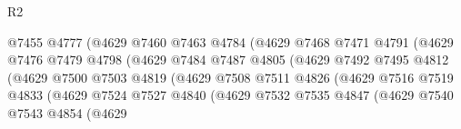 \begin{lexlean}{R2}
\begin{coremodule}
                                      @7455
                                      @4777
                                      (@4629
                                        @7460
                                        @7463
                                        @4784
                                        (@4629
                                          @7468
                                          @7471
                                          @4791
                                          (@4629
                                            @7476
                                            @7479
                                            @4798
                                            (@4629
                                              @7484
                                              @7487
                                              @4805
                                              (@4629
                                                @7492
                                                @7495
                                                @4812
                                                (@4629
                                                  @7500
                                                  @7503
                                                  @4819
                                                  (@4629
                                                    @7508
                                                    @7511
                                                    @4826
                                                    (@4629
                                                      @7516
                                                      @7519
                                                      @4833
                                                      (@4629
                                                        @7524
                                                        @7527
                                                        @4840
                                                        (@4629
                                                          @7532
                                                          @7535
                                                          @4847
                                                          (@4629
                                                            @7540
                                                            @7543
                                                            @4854
                                                            (@4629

\end{coremodule}
\end{lexlean}
